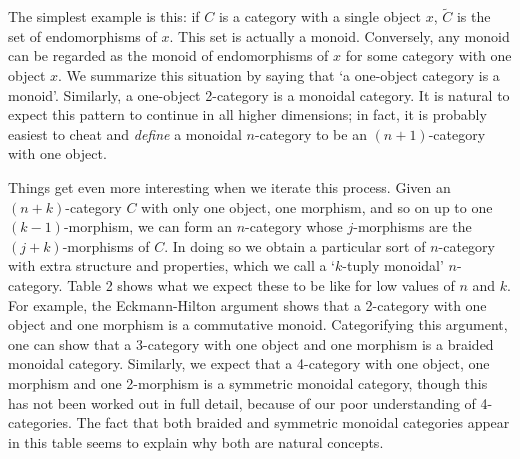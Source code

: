 The simplest example is this: if $C$ is a category with a single object
$x$, $\tilde C$ is the set of endomorphisms of $x$.  This set is
actually a monoid.  Conversely, any monoid can be regarded as the monoid
of endomorphisms of $x$ for some category with one object $x$.  We
summarize this situation by saying that `a one-object category is a
monoid'.   Similarly, a one-object 2-category is a monoidal category. 
It is natural to expect this pattern to continue in all higher
dimensions; in fact, it is probably easiest to cheat and {\it define} a
monoidal $n$-category to be an $(n+1)$-category with one object.

Things get even more interesting when we iterate this process.  Given an
 $(n+k)$-category $C$ with only one object, one morphism, and so on up
to one $(k-1)$-morphism, we can form an $n$-category whose $j$-morphisms
are the $(j+k)$-morphisms of $C$.  In doing so we obtain a particular
sort of $n$-category with extra structure and properties, which we call
a `$k$-tuply monoidal' $n$-category.  Table 2 shows what we expect these
to be like for low values of $n$ and $k$.   For example, the
Eckmann-Hilton argument \cite{BD,BN,EH} shows that a 2-category with one
object and one morphism is a commutative monoid.  Categorifying this
argument, one can show that a 3-category with one object and one
morphism is a braided monoidal category.  Similarly, we expect that a
4-category with one object, one morphism and one 2-morphism is a
symmetric monoidal category, though this has not been worked out in full
detail, because of our poor understanding of 4-categories.   The fact
that both braided and symmetric monoidal categories appear in this table
seems to explain why both are natural concepts.  

